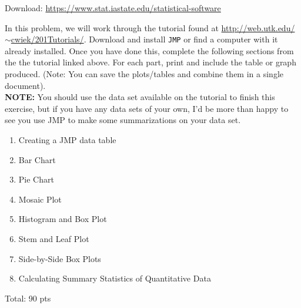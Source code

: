 \documentclass[11pt]{article}\usepackage[]{graphicx}\usepackage[]{color}
\begin{document}
\begin{itemize}
   Download: \href{https://www.stat.iastate.edu/statistical-software}{https://www.stat.iastate.edu/statistical-software}

   In this problem, we will work through the tutorial found at \href{http://web.utk.edu/~cwiek/201Tutorials/}{http://web.utk.edu/$\sim$cwiek/201Tutorials/}. Download and install \texttt{JMP} or find a computer with it already installed. Once you have done this, complete the following sections from the the tutorial linked above. For each part, print and include the table or graph produced. (Note: You can save the plots/tables and combine them in a single document).\\
\textbf{NOTE:} You should use the data set available on the tutorial to finish this exercise, but if you have any data sets of your own, I'd be more than happy to see you use JMP to make some summarizations on your data set. 

   \begin{enumerate}
      \item Creating a JMP data table
      \item Bar Chart
      \item Pie Chart
      \item Mosaic Plot
      \item Histogram and Box Plot
      \item Stem and Leaf Plot
      \item Side-by-Side Box Plots
      \item Calculating Summary Statistics of Quantitative Data
   \end{enumerate}

Total: 90 pts


















\end{itemize}
\end{document}
